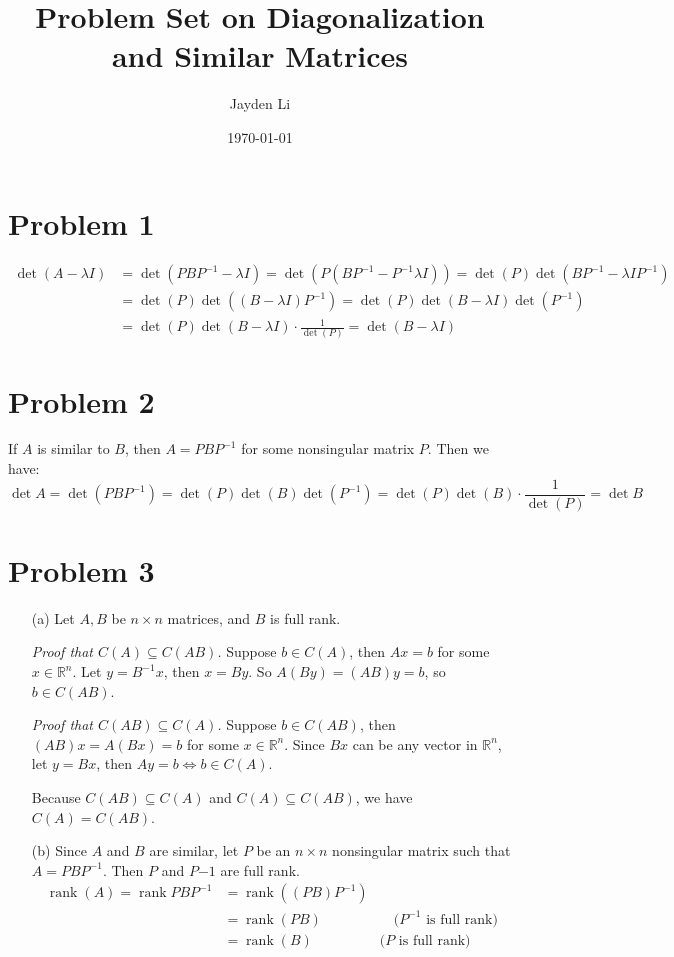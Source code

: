 \documentclass{article}
\title{\vspace*{-40pt}Problem Set on Diagonalization and Similar Matrices}
\author{Jayden Li}
\date{\today}
\newcommand*{\problem}[1]{\section*{Problem #1}}
\DeclareMathOperator{\rank}{rank}
\begin{document}
\fontsize{12pt}{12pt}\selectfont
\setlength{\abovedisplayskip}{\abovedisplayskip/2}
\setlength{\belowdisplayskip}{\belowdisplayskip/2}
\setlength{\parindent}{0pt}
\setlength{\parskip}{2ex plus 0.5ex minus 0.2ex}
\maketitle

\problem{1}
\begin{align*}
	\det \left(A-\lambda I\right)
	&=\det \left(PBP^{-1}-\lambda I\right)
	=\det \left(P \left(BP^{-1}-P^{-1}\lambda I\right)\right)
	=\det(P)\det \left(BP^{-1}-\lambda IP^{-1}\right) \\
	&=\det(P) \det \left( \left(B-\lambda I\right)P^{-1}\right)
	=\det(P)\det(B-\lambda I)\det \left(P^{-1}\right) \\
	&=\det(P)\det(B-\lambda I)\cdot \frac{1}{\det(P)}
	=\det(B-\lambda I)
\end{align*}

\problem{2}
If $A$ is similar to $B$, then $A=PBP^{-1}$ for some nonsingular matrix $P$. Then we have:
\begin{equation*}
	\det A=\det \left(PBP^{-1}\right)=\det(P)\det(B)\det(P^{-1})=\det(P)\det(B)\cdot\frac{1}{\det(P)}=\det B
\end{equation*}

\problem{3}
\begin{itemize}
	\item[(a)]
		Let $A,B$ be $n\times n$ matrices, and $B$ is full rank.

		\textit{Proof that $C(A)\subseteq C(AB)$.} Suppose $b\in C(A)$, then $Ax=b$ for some $x\in\mathbb R^n$. Let $y=B^{-1}x$, then $x=By$. So $A(By)=(AB)y=b$, so $b\in C(AB)$.

		\textit{Proof that $C(AB)\subseteq C(A)$.} Suppose $b\in C(AB)$, then $(AB)x=A(Bx)=b$ for some $x\in\mathbb R^n$. Since $Bx$ can be any vector in $\mathbb R^n$, let $y=Bx$, then $Ay=b \iff b\in C(A)$. 

		Because $C(AB)\subseteq C(A)$ and $C(A)\subseteq C(AB)$, we have $C(A)=C(AB)$.

	\item[(b)]
		Since $A$ and $B$ are similar, let $P$ be an $n\times n$ nonsingular matrix such that $A=PBP^{-1}$. Then $P$ and $P{-1}$ are full rank.
		\begin{align*}
			\rank(A)
			=\rank PBP^{-1}
			&=\rank \left((PB)P^{-1}\right) \\
			&=\rank(PB) & \quad \text{($P^{-1}$ is full rank)} \\
			&=\rank(B) & \text{($P$ is full rank)} \\
		\end{align*}
\end{itemize}
\end{document}

